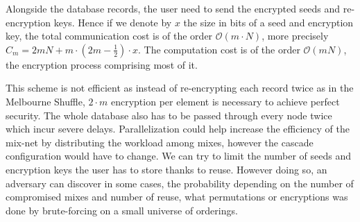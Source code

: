 \documentclass{llncs}
\begin{document}
Alongside the database records, the user need to send the encrypted seeds and re-encryption keys. Hence if we denote by $x$ the size in bits of a seed and encryption key, the total communication cost is of the order $\mathcal{O}\left ( m\cdot N \right )$, more precisely $C_m=2mN + m\cdot(2m-\frac{1}{2})\cdot x$.
The computation cost is of the order $\mathcal{O}\left(mN\right)$, the encryption process comprising most of it.

This scheme is not efficient as instead of re-encrypting each record twice as in the Melbourne Shuffle, $2\cdot m$ encryption per element is necessary to achieve perfect security. The whole database also has to be passed through every node twice which incur severe delays. Parallelization could help increase the efficiency of the mix-net by distributing the workload among mixes, however the cascade configuration would have to change.
We can try to limit the number of seeds and encryption keys the user has to store thanks to reuse. However doing so, an adversary can discover in some cases, the probability depending on the number of compromised mixes and number of reuse, what permutations or encryptions was done by brute-forcing on a small universe of orderings.
\end{document}
